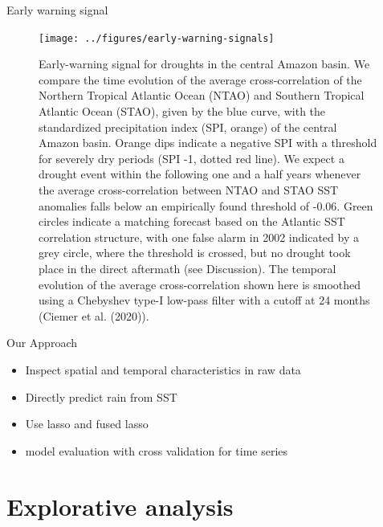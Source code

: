 \documentclass[
  ignorenonframetext,
]{beamer}
\providecommand{\tightlist}{%
  \setlength{\itemsep}{0pt}\setlength{\parskip}{0pt}}
\begin{document}
\begin{frame}{Early warning signal}
\protect\hypertarget{early-warning-signal}{}
\begin{figure}

{\centering \texttt{[image: ../figures/early-warning-signals]} 

}

\caption{Early-warning signal for droughts in the central Amazon basin. We compare the time evolution of the average cross-correlation of the Northern Tropical Atlantic Ocean (NTAO) and Southern Tropical Atlantic Ocean (STAO), given by the blue curve, with the standardized precipitation index (SPI, orange) of the central Amazon basin. Orange dips indicate a negative SPI with a threshold for severely dry periods (SPI -1, dotted red line). We expect a drought event within the following one and a half years whenever the average cross-correlation between NTAO and STAO SST anomalies falls below an empirically found threshold of -0.06. Green circles indicate a matching forecast based on the Atlantic SST correlation structure, with one false alarm in 2002 indicated by a grey circle, where the threshold is crossed, but no drought took place in the direct aftermath (see Discussion). The temporal evolution of the average cross-correlation shown here is smoothed using a Chebyshev type-I low-pass filter with a cutoff at 24 months (Ciemer et al. (2020)).}\label{fig:early}
\end{figure}
\end{frame}

\begin{frame}{Our Approach}
\protect\hypertarget{our-approach}{}
\begin{itemize}
\tightlist
\item
  Inspect spatial and temporal characteristics in raw data
\item
  Directly predict rain from SST
\item
  Use lasso and fused lasso
\item
  model evaluation with cross validation for time series
\end{itemize}
\end{frame}

\hypertarget{explorative-analysis}{%
\section{Explorative analysis}\label{explorative-analysis}}
\end{document}
